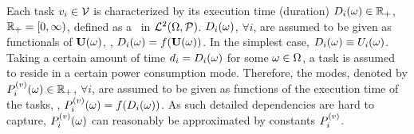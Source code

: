 Each task $v_i \in \mathcal{V}$ is characterized by its execution time (duration) $D_i(\omega) \in \mathbb{R}_+$, $\mathbb{R}_+ = [0, \infty)$, defined as a \rv\ in $\mathcal{L}^{2}(\Omega, \mathcal{P})$. $D_i(\omega)$, $\forall i$, are assumed to be given as functionals of $\mathbf{U}(\omega)$, \ie, $D_i(\omega) = f(\mathbf{U}(\omega))$. In the simplest case, $D_i(\omega) \equiv U_i(\omega)$. Taking a certain amount of time $d_i = D_i(\omega)$ for some $\omega \in \Omega$, a task is assumed to reside in a certain power consumption mode. Therefore, the modes, denoted by $P^{(v)}_i(\omega) \in \mathbb{R}_+$, $\forall i$, are assumed to be given as functions of the execution time of the tasks, \ie, $P^{(v)}_i(\omega) = f(D_i(\omega))$. As such detailed dependencies are hard to capture, $P^{(v)}_i(\omega)$ can reasonably be approximated by constants $P^{(v)}_i$.
